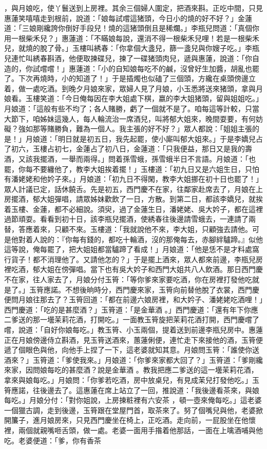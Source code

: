 ，與月娘吃，使丫鬟送到上房裡。其余三個婦人圍定，把酒來斟。正吃中間，只見惠蓮笑嘻嘻走到根前，說道：「娘每試嚐這猪頭，今日小的燒的好不好？」金蓮道：「三娘剛纔誇你倒好手段兒！燒的這猪頭倒且是稀爛。」李瓶兒問道：「真個你用一根柴禾兒？」惠蓮道：「不瞞娘每說，還消不得一根柴禾兒哩！若是一根柴禾兒，就燒的脫了骨。」玉樓叫綉春：「你拿個大盞兒，篩一盞兒與你嫂子吃。」李瓶兒連忙叫綉春斟酒，他便取揀碟兒，揀了一碟猪頭肉兒，遞與惠蓮，說道：「你自造的，你試嚐嚐！」惠蓮道：「小的自知娘每吃不的鹹，沒曾好生加醬，胡亂也罷了。下次再燒時，小的知道了！」于是插燭也似磕了三個頭，方纔在桌頭傍邊立着，做一處吃酒。到晚夕月娘來家，眾婦人見了月娘，小玉悉將送來猪頭，拿與月娘看。玉樓笑道：「今日俺每因在李大姐處下棋，嬴的李大姐猪頭，留與姐姐吃。」月娘道：「這般有些不均了；各人賭勝，虧了一個就不是了。咱每這等計較，只當大節下，咱姊妹這幾人，每人輪流治一席酒兒，叫將郁大姐來，晚間耍要，有何妨礙？強如那等賭勝負，難為一個人。我主張的好不好？」眾人都說：「姐姐主張的是！」月娘道：「明日就是初五日，我先起罷，使小廝叫郁大姐來。」于是李嬌兒占了初六，玉樓占初七，金蓮占了初八日，金蓮道：「只我便益，那日又是我的壽酒，又該我擺酒，一舉而兩得。」問着孫雪蛾，孫雪蛾半日不言語。月娘道：「也罷，你每不要纏他了，教李大姐挨着擺！」玉樓道：「初九日又是六姐生日，只怕有潘姥姥和他妗子來。」月娘道：「初九日不得閑，教李大姐挪在初十日也罷了！」眾人計議已定，話休饒舌。先是初五，西門慶不在家，往鄰家赴席去了，月娘在上房擺酒，郁大姐彈唱，請眾姊妹歡飲了一日，方散。到第二日，都該李嬌兒，就挨着玉樓、金蓮，都不必細說。須臾，過了金蓮生日，潘姥姥、吳大妗子，都在這裡過節頑耍。看看到初十日，該李瓶兒擺酒，使綉春往後邊請雪蛾去，一連請了兩替，答應着來，只顧不來。玉樓道：「我就說他不來，李大姐，只顧強去請他。可是他對着人說的：『你每有錢的，都吃十輪酒，沒的那俺每去，赤腳絆驢蹄。』似他這等說，俺每罷了，把大姐姐都當驢蹄了看成！」月娘道：「他是恁不是才料處窩行貨子！都不消理他了。又請他怎的？」于是擺上酒來，眾人都來前邊，李瓶兒房裡吃酒，郁大姐在傍彈唱。當下也有吳大妗子和西門大姐共八人飲酒。那日西門慶不在家，往人家去了，月娘分付玉筲：「等你爹來家要吃酒，你在房裡打發他吃就是了。」玉筲應諾。不想後晌時分，西門慶來家，玉筲向前替他脫了衣裳，西門慶便問月娘往那去了？玉筲回道：「都在前邊六娘房裡，和大妗子、潘姥姥吃酒哩！」西門慶道：「吃的是甚麼酒？」玉筲道：「是金華酒 。」西門慶道：「還有年下你應二爹送的那一壜茉莉花酒，打開吃。」一面教玉筲旋把茉莉花酒打開，西門慶嚐了嚐，說道：「自好你娘每吃。」教玉筲、小玉兩個，提着送到前邊李瓶兒房中。惠蓮正在月娘傍邊侍立斟酒，見玉筲送酒來，蕙蓮俐便，連忙走下來接他的酒，玉筲便遞了個眼色與他，向他手上捏了一下，這老婆就知其意。月娘問玉筲：「誰使你送酒來？」玉筲道：「爹使我來。」月娘道：「你爹來家都大回了？」玉筲道：「爹剛纔來家，因問娘每吃的甚麼酒？說是金華酒 。教我把應二爹送的這一壜茉莉花酒，拿來與娘每吃。」月娘問：「你爹若吃酒，房中放桌兒，有見成茉兒打發他吃。」玉筲應諾，往後邊去了。這惠蓮在席上站立了一回，推說道：「我後邊看茶來，與娘每吃。」月娘分付：「對你姐說，上房揀粧裡有六安茶 ，頓一壺來俺每吃。」這老婆一個獵古調，走到後邊，玉筲跟在堂屋門首，取茶來了。努了個嘴兒與他，老婆掀開簾子，進月娘房來，只見西門慶坐在椅上，正吃酒。走向前，一屁股坐在他懷裡，兩個就親嘴咂舌頭，做一處。老婆一面用手揝着他那話，一面在上噙酒哺與他吃。老婆便道：「爹，你有香茶 